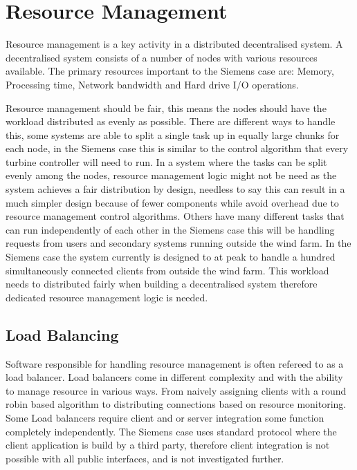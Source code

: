 \chapter{Resource Management} %

Resource management is a key activity in a distributed decentralised system.
A decentralised system consists of a number of nodes with various resources available. 
The primary resources important to the Siemens case are: Memory, Processing time, Network bandwidth and Hard drive I/O operations. %

Resource management should be fair, this means the nodes should have the workload distributed as evenly as possible.
There are different ways to handle this, some systems are able to split a single task up in equally large chunks for each node, in the Siemens case this is similar to the control algorithm that every turbine controller will need to run.
In a system where the tasks can be split evenly among the nodes, resource management logic might not be need as the system achieves a fair distribution by design, needless to say this can result in a much simpler design because of fewer components while avoid overhead due to resource management control algorithms. %
Others have many different tasks that can run independently of each other in the Siemens case this will be handling requests from users and secondary systems running outside the wind farm.
In the Siemens case the system currently is designed to at peak to handle a hundred simultaneously connected clients from outside the wind farm. This workload needs to distributed fairly when building a decentralised system therefore dedicated resource management logic is needed.

\section{Load Balancing}
Software responsible for handling resource management is often refereed to as a load balancer.
Load balancers come in different complexity and with the ability to manage resource in various ways.
From naively assigning clients with a round robin based algorithm to distributing connections based on resource monitoring.
Some Load balancers require client and or server integration some function completely independently.
The Siemens case uses standard protocol where the client application is build by a third party,
therefore client integration is not possible with all public interfaces, and is not investigated further.

